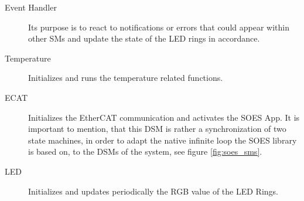 \begin{description}
\item[Event Handler] Its purpose is to react to notifications or errors that could appear within other SMs and update the state of the LED rings in accordance.

\item[Temperature] Initializes and runs the temperature related functions.

\item[ECAT] Initializes the EtherCAT communication and activates the SOES App. It is important to mention, that this DSM is rather a synchronization of two state machines,
      in order to adapt the native infinite loop the SOES library is based on, to the DSMs of the system, see figure \ref{fig:soes_sms}. 

\item[LED] Initializes and updates periodically the RGB value of the LED Rings.

\end{description}

